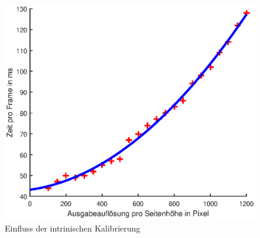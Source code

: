 \begin{figure}[!htb]
	\centering
	\includegraphics[width=\textwidth]{images/runningTimePerSlantheight.eps}
	\caption{Einfluss der intrinischen Kalibrierung}
	\label{fig:influenceRes}
\end{figure}
























